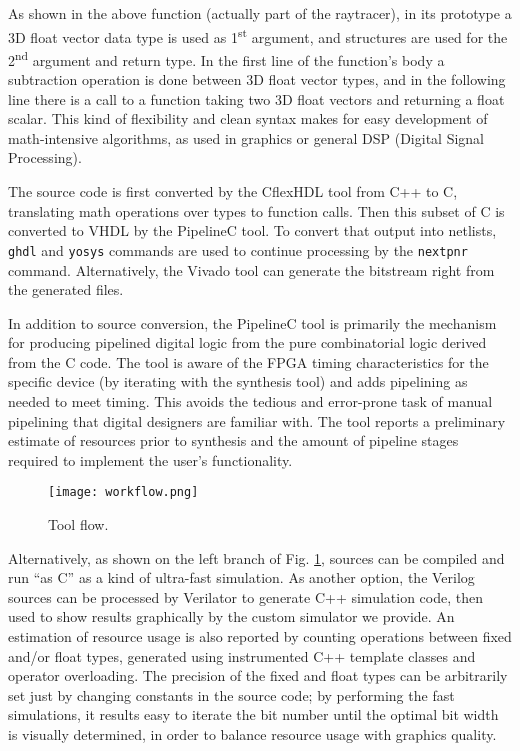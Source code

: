 \documentclass[conference]{IEEEtran}
\begin{document}
As shown in the above function (actually part of the raytracer), in its prototype a 3D float vector data type is used as 1\textsuperscript{st} argument, and structures are used for the 2\textsuperscript{nd} argument and return type. In the first line of the function's body a subtraction operation is done between 3D float vector types, and in the following line there is a call to a function taking two 3D float vectors and returning a float scalar. This kind of flexibility and clean syntax makes for easy development of math-intensive algorithms, as used in graphics or general DSP (Digital Signal Processing). 

The source code is first converted by the CflexHDL tool from C++ to C, translating math operations over types to function calls. Then this subset of C is converted to VHDL by the PipelineC tool. To convert that output into netlists, \texttt{ghdl} and \texttt{yosys} commands are used to continue processing by the \texttt{nextpnr} command. Alternatively, the Vivado tool can generate the bitstream right from the generated files. 

In addition to source conversion, the PipelineC tool is primarily the mechanism for producing pipelined digital logic from the pure combinatorial logic derived from the C code. The tool is aware of the FPGA timing characteristics for the specific device (by iterating with the synthesis tool) and adds pipelining as needed to meet timing. This avoids the tedious and error-prone task of manual pipelining that digital designers are familiar with. The tool reports a preliminary estimate of resources prior to synthesis and the amount of pipeline stages required to implement the user’s functionality.

\begin{figure}
\texttt{[image: workflow.png]}
\caption{Tool flow.}
\label{figflow}
\end{figure}

Alternatively, as shown on the left branch of Fig. \ref{figflow}, sources can be compiled and run “as C” as a kind of ultra-fast simulation. As another option, the Verilog sources can be processed by Verilator to generate C++ simulation code, then used to show results graphically by the custom simulator we provide. An estimation of resource usage is also reported by counting operations between fixed and/or float types, generated using instrumented C++ template classes and operator overloading. The precision of the fixed and float types can be arbitrarily set just by changing constants in the source code; by performing the fast simulations, it results easy to iterate the bit number until the optimal bit width is visually determined, in order to balance resource usage with graphics quality.
\end{document}
